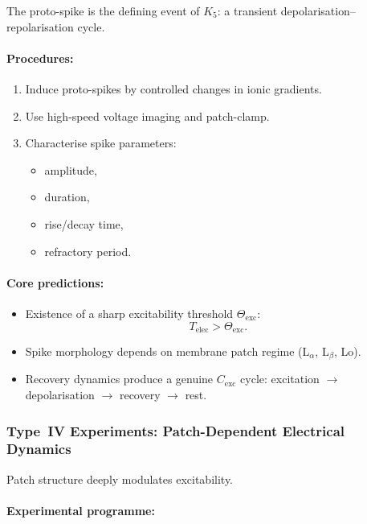 The proto-spike is the defining event of $K_5$:
a transient depolarisation–repolarisation cycle.

\paragraph{Procedures:}

\begin{enumerate}
    \item Induce proto-spikes by controlled changes in ionic gradients.
    \item Use high-speed voltage imaging and patch-clamp.
    \item Characterise spike parameters:
          \begin{itemize}
              \item amplitude,
              \item duration,
              \item rise/decay time,
              \item refractory period.
          \end{itemize}
\end{enumerate}

\paragraph{Core predictions:}

\begin{itemize}
    \item Existence of a sharp excitability threshold $\Theta_{\mathrm{exc}}$:
          \[
              T_{\mathrm{elec}} > \Theta_{\mathrm{exc}}.
          \]
    \item Spike morphology depends on membrane patch regime
          (L$_\alpha$, L$_\beta$, Lo).
    \item Recovery dynamics produce a genuine $C_{\mathrm{exc}}$ cycle:
          excitation $\rightarrow$ depolarisation $\rightarrow$
          recovery $\rightarrow$ rest.
\end{itemize}



\subsubsection{Type~IV Experiments: Patch-Dependent Electrical Dynamics}

Patch structure deeply modulates excitability.

\paragraph{Experimental programme:}

